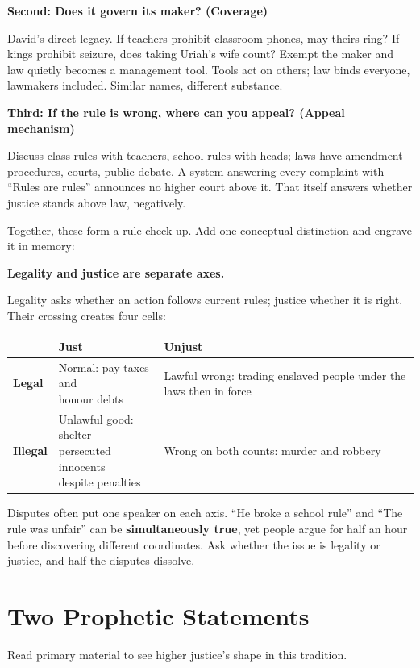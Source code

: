 \textbf{Second: Does it govern its maker? (Coverage)}

David's direct legacy. If teachers prohibit classroom phones, may theirs ring? If kings prohibit seizure, does taking Uriah's wife count? Exempt the maker and law quietly becomes a management tool. Tools act on others; law binds everyone, lawmakers included. Similar names, different substance.

\textbf{Third: If the rule is wrong, where can you appeal? (Appeal mechanism)}

Discuss class rules with teachers, school rules with heads; laws have amendment procedures, courts, public debate. A system answering every complaint with ``Rules are rules'' announces no higher court above it. That itself answers whether justice stands above law, negatively.

Together, these form a rule check-up. Add one conceptual distinction and engrave it in memory:

\textbf{Legality and justice are separate axes.}

Legality asks whether an action follows current rules; justice whether it is right. Their crossing creates four cells:

\noindent
\begin{tabularx}{\linewidth}{llX}
\toprule
 & Just & Unjust \\
\midrule
\textbf{Legal} & \shortstack[l]{Normal: pay taxes and\\ honour debts} & Lawful wrong: trading enslaved people under the laws then in force \\
\textbf{Illegal} & \shortstack[l]{Unlawful good: shelter\\ persecuted innocents\\ despite penalties} & Wrong on both counts: murder and robbery \\
\bottomrule
\end{tabularx}

\smallskip
Disputes often put one speaker on each axis. ``He broke a school rule'' and ``The rule was unfair'' can be \textbf{simultaneously true}, yet people argue for half an hour before discovering different coordinates. Ask whether the issue is legality or justice, and half the disputes dissolve.

\section{Two Prophetic Statements}
Read primary material to see higher justice's shape in this tradition.

